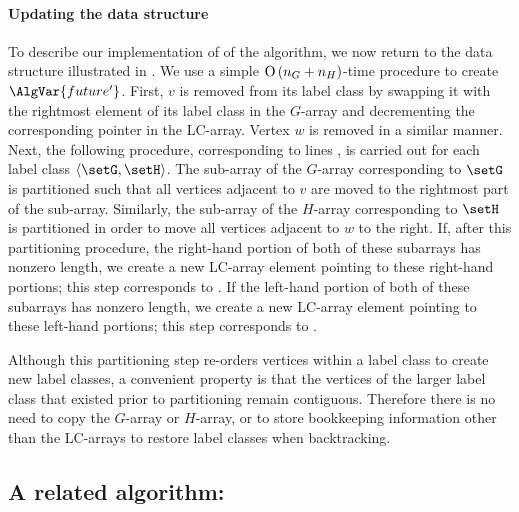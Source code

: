 \paragraph{Updating the data structure}
To describe
our implementation of  of the algorithm,
we now return to the data structure illustrated in .
We use a simple $\operatorname{O}\left(n_G+n_H\right)$-time procedure to create $\AlgVar{future'}$.
First, $v$ is removed from its label class by swapping it with the rightmost
element of its label class in the $G$-array and decrementing the corresponding
pointer in the LC-array. Vertex $w$ is removed in a similar manner.
Next, the following procedure, corresponding to lines ,
is carried out for each label class $\langle \setG,\setH \rangle$.  The sub-array
of the $G$-array corresponding to $\setG$ is partitioned such that all vertices adjacent to $v$ are moved to
the rightmost part of the sub-array. Similarly, the sub-array of the $H$-array corresponding to $\setH$
is partitioned in order to move all vertices adjacent to $w$ to the right.
If, after this partitioning procedure, the right-hand portion of both of these subarrays
has nonzero length, we create a new LC-array element pointing to these right-hand portions;
this step corresponds to .
If the left-hand portion of both of these subarrays
has nonzero length, we create a new LC-array element pointing to these left-hand portions;
this step corresponds to .

Although this partitioning step re-orders vertices within a label class
to create new label classes, a convenient property is that the vertices
of the larger label class that existed prior to partitioning remain contiguous.
Therefore there is no need
to copy the $G$-array or $H$-array, or to store bookkeeping information
other than the LC-arrays to restore label classes when backtracking.

\subsection{A related algorithm: \citet{DBLP:journals/jacm/SchmidtD76}}

